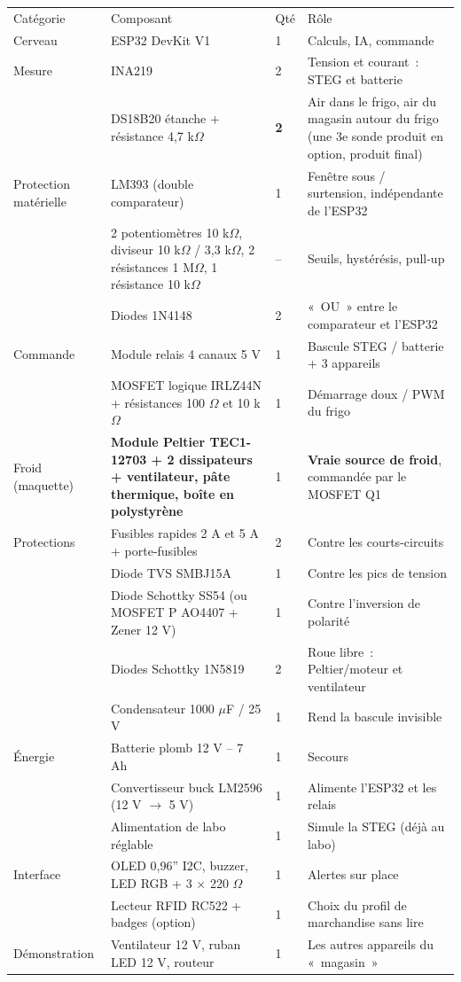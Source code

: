 \documentclass[10pt,a4paper]{article}
\begin{document}
\begin{tabularx}{\linewidth}{Q{2.3cm}P{5.6cm}P{0.8cm}L}
 Catégorie & \mdseries Composant & \mdseries Qté & \mdseries Rôle \\
Cerveau & ESP32 DevKit V1 & 1 & Calculs, IA, commande \\
Mesure & INA219 & 2 & Tension et courant~: STEG et batterie \\
 & DS18B20 étanche + résistance 4,7 k$\Omega$ & \textbf{2} & Air dans le frigo, air du magasin autour du frigo (une 3e sonde produit en option, produit final) \\
Protection matérielle & LM393 (double comparateur) & 1 & Fenêtre sous / surtension, indépendante de l'ESP32 \\
 & 2 potentiomètres 10 k$\Omega$, diviseur 10 k$\Omega$ / 3,3 k$\Omega$, 2 résistances 1 M$\Omega$, 1 résistance 10 k$\Omega$ & -- & Seuils, hystérésis, pull-up \\
 & Diodes 1N4148 & 2 & «~OU~» entre le comparateur et l'ESP32 \\
Commande & Module relais 4 canaux 5 V & 1 & Bascule STEG / batterie + 3 appareils \\
 & MOSFET logique IRLZ44N + résistances 100 $\Omega$ et 10 k$\Omega$ & 1 & Démarrage doux / PWM du frigo \\
Froid (maquette) & \textbf{Module Peltier TEC1-12703 + 2 dissipateurs + ventilateur, pâte thermique, boîte en polystyrène} & 1 & \textbf{Vraie source de froid}, commandée par le MOSFET Q1 \\
Protections & Fusibles rapides 2 A et 5 A + porte-fusibles & 2 & Contre les courts-circuits \\
 & Diode TVS SMBJ15A & 1 & Contre les pics de tension \\
 & Diode Schottky SS54 (ou MOSFET P AO4407 + Zener 12 V) & 1 & Contre l'inversion de polarité \\
 & Diodes Schottky 1N5819 & 2 & Roue libre~: Peltier/moteur et ventilateur \\
 & Condensateur 1000 $\mu$F / 25 V & 1 & Rend la bascule invisible \\
Énergie & Batterie plomb 12 V -- 7 Ah & 1 & Secours \\
 & Convertisseur buck LM2596 (12 V $\rightarrow$ 5 V) & 1 & Alimente l'ESP32 et les relais \\
 & Alimentation de labo réglable & 1 & Simule la STEG (déjà au labo) \\
Interface & OLED 0,96'' I2C, buzzer, LED RGB + 3 $\times$ 220 $\Omega$ & 1 & Alertes sur place \\
 & Lecteur RFID RC522 + badges (option) & 1 & Choix du profil de marchandise sans lire \\
Démonstration & Ventilateur 12 V, ruban LED 12 V, routeur & 1 & Les autres appareils du «~magasin~» \\
\end{tabularx}
\end{document}
